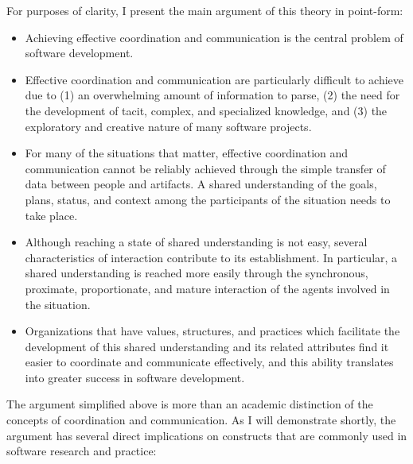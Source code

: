 For purposes of clarity, I present the main argument of this theory in point-form:

\begin{itemize}
\item Achieving effective coordination and communication is the central problem of software development.

\item Effective coordination and communication are particularly difficult to achieve due to (1) an overwhelming amount of information to parse, (2) the need for the development of tacit, complex, and specialized knowledge, and (3) the exploratory and creative nature of many software projects.

\item For many of the situations that matter, effective coordination and communication cannot be reliably achieved through the simple transfer of data between people and artifacts. A shared understanding of the goals, plans, status, and context among the participants of the situation needs to take place.

\item Although reaching a state of shared understanding is not easy, several characteristics of interaction contribute to its establishment. In particular, a shared understanding is reached more easily through the synchronous, proximate, proportionate, and mature interaction of the agents involved in the situation.

\item Organizations that have values, structures, and practices which facilitate the development of this shared understanding and its related attributes find it easier to coordinate and communicate effectively, and this ability translates into greater success in software development.
\end{itemize}

The argument simplified above is more than an academic distinction of the concepts of coordination and communication. As I will demonstrate shortly, the argument has several direct implications on constructs that are commonly used in software research and practice:

